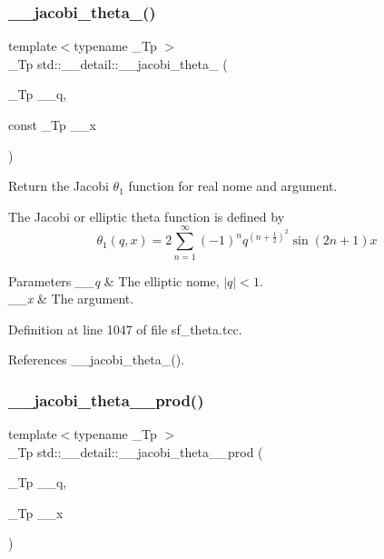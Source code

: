 \subsubsection{\texorpdfstring{\+\_\+\+\_\+jacobi\+\_\+theta\+\_()}{\_\_jacobi\_theta\_1()}\hspace{0.1cm}{\footnotesize\ttfamily [2/2]}}
{\footnotesize\ttfamily template$<$typename \+\_\+\+Tp $>$ \\
\+\_\+\+Tp std\+::\+\_\+\+\_\+detail\+::\+\_\+\+\_\+jacobi\+\_\+theta\+\_ (\begin{DoxyParamCaption}\item[{\+\_\+\+Tp}]{\+\_\+\+\_\+q,  }\item[{const \+\_\+\+Tp}]{\+\_\+\+\_\+x }\end{DoxyParamCaption})}

Return the Jacobi $ \theta_1 $ function for real nome and argument.

The Jacobi or elliptic theta function is defined by \[ \theta_1(q,x) = 2\sum_{n=1}^{\infty}(-1)^n q^{(n+\frac{1}{2})^2}\sin{(2n+1)x} \]


\begin{DoxyParams}{Parameters}
{\em \+\_\+\+\_\+q} & The elliptic nome, $ |q| < 1 $. \\
\hline
{\em \+\_\+\+\_\+x} & The argument. \\
\hline
\end{DoxyParams}


Definition at line 1047 of file sf\+\_\+theta.\+tcc.



References \+\_\+\+\_\+jacobi\+\_\+theta\+\_().

\mbox{\label{namespacestd_1_1____detail_a6283a61803d2bc02eebf1d1a12b1bb52}} 
\subsubsection{\texorpdfstring{\+\_\+\+\_\+jacobi\+\_\+theta\+\_\+\_\+prod()}{\_\_jacobi\_theta\_1\_prod()}}
{\footnotesize\ttfamily template$<$typename \+\_\+\+Tp $>$ \\
\+\_\+\+Tp std\+::\+\_\+\+\_\+detail\+::\+\_\+\+\_\+jacobi\+\_\+theta\+\_\+\_\+prod (\begin{DoxyParamCaption}\item[{\+\_\+\+Tp}]{\+\_\+\+\_\+q,  }\item[{\+\_\+\+Tp}]{\+\_\+\+\_\+x }\end{DoxyParamCaption})}

